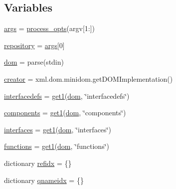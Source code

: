 \subsection*{Variables}
\begin{DoxyCompactItemize}
\item 
\hyperlink{namespacenesdoc_1_1archive_a5f2a33f88a6a55a1afac59f62b45c81f}{args} = \hyperlink{namespacenesdoc_1_1archive_a01d74930ad9f3b40230adeb25277368f}{process\+\_\+opts}(argv\mbox{[}1\+:\mbox{]})
\item 
\hyperlink{namespacenesdoc_1_1archive_a0b434b5e284b049fa9af5523220dd992}{repository} = \hyperlink{namespacenesdoc_1_1archive_a5f2a33f88a6a55a1afac59f62b45c81f}{args}\mbox{[}0\mbox{]}
\item 
\hyperlink{namespacenesdoc_1_1archive_a9447d2728dbdda43111396d792a51c52}{dom} = parse(stdin)
\item 
\hyperlink{namespacenesdoc_1_1archive_a3513e932db34a29962898805cc7e7993}{creator} = xml.\+dom.\+minidom.\+get\+D\+O\+M\+Implementation()
\item 
\hyperlink{namespacenesdoc_1_1archive_afe4518e3eebbcac2da1b4f8d561aa5d9}{interfacedefs} = \hyperlink{namespacenesdoc_1_1archive_a0e1ef9fd5092eb3e085b0a8024c835a7}{get1}(\hyperlink{namespacenesdoc_1_1archive_a9447d2728dbdda43111396d792a51c52}{dom}, \char`\"{}interfacedefs\char`\"{})
\item 
\hyperlink{namespacenesdoc_1_1archive_ae7a2b64dda9dc7c81933106dcb0913e9}{components} = \hyperlink{namespacenesdoc_1_1archive_a0e1ef9fd5092eb3e085b0a8024c835a7}{get1}(\hyperlink{namespacenesdoc_1_1archive_a9447d2728dbdda43111396d792a51c52}{dom}, \char`\"{}components\char`\"{})
\item 
\hyperlink{namespacenesdoc_1_1archive_a9aa3880654d334dce3324daf7592ad8a}{interfaces} = \hyperlink{namespacenesdoc_1_1archive_a0e1ef9fd5092eb3e085b0a8024c835a7}{get1}(\hyperlink{namespacenesdoc_1_1archive_a9447d2728dbdda43111396d792a51c52}{dom}, \char`\"{}interfaces\char`\"{})
\item 
\hyperlink{namespacenesdoc_1_1archive_af12b4f9e9b4aa2c2b977e63ebe8f8b93}{functions} = \hyperlink{namespacenesdoc_1_1archive_a0e1ef9fd5092eb3e085b0a8024c835a7}{get1}(\hyperlink{namespacenesdoc_1_1archive_a9447d2728dbdda43111396d792a51c52}{dom}, \char`\"{}functions\char`\"{})
\item 
dictionary \hyperlink{namespacenesdoc_1_1archive_a7de5aa191c7e1c7dacc3f71f6d814057}{refidx} = \{\}
\item 
dictionary \hyperlink{namespacenesdoc_1_1archive_a211c0217f300886586e4c906e1fa3dab}{qnameidx} = \{\}

\end{DoxyCompactItemize}
